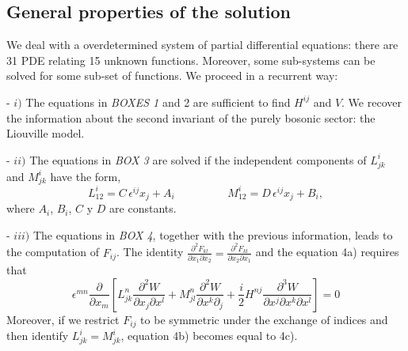 \documentclass[a4paper,11pt,twoside]{article}
\begin{document}
\begin{center}
\end{center}






\subsection{General properties of the solution}
We deal with a overdetermined system of partial differential
equations: there are 31 PDE relating 15 unknown functions.
Moreover, some sub-systems can be solved for some sub-set of
functions. We proceed in a recurrent way:

\vspace*{0.1cm}

- $i)$ The equations in {\it BOXES 1} and {2} are sufficient to
find  $H^{ij}$ and $V$. We recover the information about the
second invariant of the purely bosonic sector: the Liouville
model.

\vspace*{0.1cm}

- $ii)$ The equations in {\it BOX 3} are solved if the independent
components of $L^i_{jk}$ and $M^i_{jk}$ have the form,
\[
L^i_{12}=C\, \epsilon^{ij} x_j +A_i \hspace{2cm} M^i_{12}=D \,
\epsilon^{ij} x_j +B_i ,
\]
where $A_i$, $B_i$, $C$ y $D$ are constants.

\vspace*{0.1cm}

- $iii)$ The equations in {\it BOX 4}, together with the previous
information, leads to the  computation of $F_{ij}$. The identity
$=$ and the
equation 4a) requires that
\[
\epsilon^{mn} \displaystyle\frac{\partial}{\partial x_m} \left[ L^n_{jk}
\frac{\partial^2 W}{\partial x_j\partial x^l}+
M^n_{jl}\frac{\partial^2 W}{\partial x^k\partial_j}+\frac{i}{2}
H^{nj}\frac{\partial^3 W}{\partial x^j\partial x^k\partial x^l}
\right]=0
\]
Moreover, if we restrict $F_{ij}$ to be symmetric under the
exchange of indices and then identify $L^i_{jk}=M^i_{jk}$,
equation 4b) becomes equal to 4c).
\end{document}
